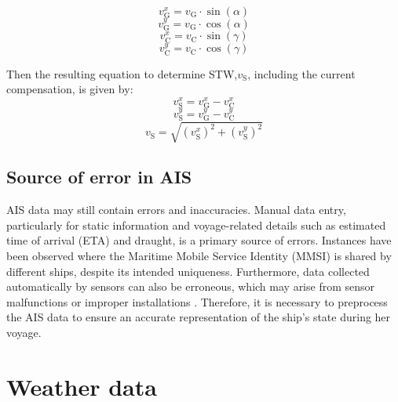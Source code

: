 \begin{equation}\label{eqn:sogx}
    v_{\text{G}}^x = v_{\text{G}}\cdot\sin(\alpha)   
\end{equation}
\begin{equation}\label{eqn:sogy}
    v_{\text{G}}^y = v_{\text{G}}\cdot\cos(\alpha)   
\end{equation} 
\begin{equation}\label{eqn:vcurrx}
     v_{\text{C}}^x = v_{\text{C}}\cdot\sin(\gamma)   
\end{equation}
\begin{equation}\label{eqn:vcurry}
    v_{\text{C}}^y = v_{\text{C}}\cdot\cos(\gamma)   
\end{equation}

Then the resulting equation to determine STW,$v_{\text{S}}$, including the current compensation, is given by:\\

\begin{equation}\label{eqn:stwx}
    v_{\text{S}}^x = v_{\text{G}}^x - v_{\text{C}}^x    
\end{equation}
\begin{equation}\label{eqn:stwy}
    v_{\text{S}}^y = v_{\text{G}}^y - v_{\text{C}}^y      
\end{equation}
\begin{equation}\label{eqn:stwabs}
    v_{\text{S}} = \sqrt{(v_{\text{S}}^x)^2 + (v_{\text{S}}^y)^2} 
\end{equation}

\subsection{Source of error in AIS}\label{sec:AIS_error}

AIS data may still contain errors and inaccuracies. Manual data entry, particularly for static information and voyage-related details such as estimated time of arrival (ETA) and draught, is a primary source of errors. Instances have been observed where the Maritime Mobile Service Identity (MMSI) is shared by different ships, despite its intended uniqueness. Furthermore, data collected automatically by sensors can also be erroneous, which may arise from sensor malfunctions or improper installations . Therefore, it is necessary to preprocess the AIS data to ensure an accurate representation of the ship's state during her voyage.\\    

\section{Weather data}\label{sec:weather_theo}

